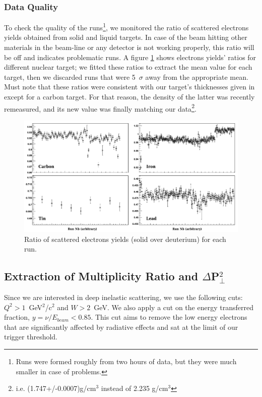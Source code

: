 \subsubsection{Data Quality}

To check the quality of the runs\footnote{Runs were formed roughly from two hours
of data, but they were much smaller in case of problems.}, we monitored the ratio of scattered electrons yields obtained from solid and liquid targets. In case of the beam hitting other materials in the beam-line or any detector is not working 
properly, this ratio will be off and indicates problematic runs. A figure 
\ref{DataQ} shows electrons yields' ratios for different nuclear target; we fitted these ratios to extract the mean value for each target, then we discarded runs that were 5~$\sigma$ away from the appropriate mean. Must note that these ratios were consistent with our target's thicknesses given in \cite{Hakobyan:2008zz} except for a carbon target. For that reason, the density of the latter was recently remeasured, and its new value was finally matching our data\footnote{i.e. (1.747+/-0.0007)g/cm$^3$ instead of 2.235 g/cm$^3$}.

\begin{figure}[tbp]
\centering
\includegraphics[width=15cm] {chap5-fig/TargetElRatio.png}
\caption {Ratio of scattered electrons yields (solid over deuterium) for each run.}
\label{DataQ}
\end{figure}

\subsection{Extraction of Multiplicity Ratio and $\Delta$P$_\perp^2$}
\label{sec:obs}

Since we are interested in deep inelastic scattering, we use the following 
cuts: $Q^2 > 1$~GeV$^2$/c$^2$ and $W > 2$~GeV. We also apply a cut on the energy transferred fraction, $y = \nu/E_{beam} < 0.85$. This cut aims to remove the low energy electrons that are significantly affected by radiative effects and sat at the limit of our trigger threshold.


